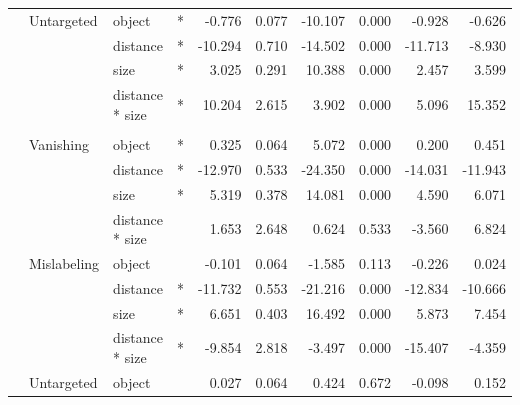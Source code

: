 \documentclass[
]{article}
\begin{document}
\begin{longtable}[t]{llllrrrrrr}
\cmidrule{2-10}\nopagebreak
\hspace{1em} & Untargeted & object & * & -0.776 & 0.077 & -10.107 & 0.000 & -0.928 & -0.626\\
\cmidrule{3-10}\nopagebreak
\hspace{1em} &  & distance & * & -10.294 & 0.710 & -14.502 & 0.000 & -11.713 & -8.930\\
\cmidrule{3-10}\nopagebreak
\hspace{1em} &  & size & * & 3.025 & 0.291 & 10.388 & 0.000 & 2.457 & 3.599\\
\cmidrule{3-10}\nopagebreak
\hspace{1em} &  & distance * size & * & 10.204 & 2.615 & 3.902 & 0.000 & 5.096 & 15.352\\
\cmidrule{1-10}\pagebreak[0]
\addlinespace[0.3em]
\multicolumn{10}{l}{\textbf{SSD}}\\
\hspace{1em} & Vanishing & object & * & 0.325 & 0.064 & 5.072 & 0.000 & 0.200 & 0.451\\
\cmidrule{3-10}\nopagebreak
\hspace{1em} &  & distance & * & -12.970 & 0.533 & -24.350 & 0.000 & -14.031 & -11.943\\
\cmidrule{3-10}\nopagebreak
\hspace{1em} &  & size & * & 5.319 & 0.378 & 14.081 & 0.000 & 4.590 & 6.071\\
\cmidrule{3-10}\nopagebreak
\hspace{1em} &  & distance * size &  & 1.653 & 2.648 & 0.624 & 0.533 & -3.560 & 6.824\\
\cmidrule{2-10}\nopagebreak
\hspace{1em} & Mislabeling & object &  & -0.101 & 0.064 & -1.585 & 0.113 & -0.226 & 0.024\\
\cmidrule{3-10}\nopagebreak
\hspace{1em} &  & distance & * & -11.732 & 0.553 & -21.216 & 0.000 & -12.834 & -10.666\\
\cmidrule{3-10}\nopagebreak
\hspace{1em} &  & size & * & 6.651 & 0.403 & 16.492 & 0.000 & 5.873 & 7.454\\
\cmidrule{3-10}\nopagebreak
\hspace{1em} &  & distance * size & * & -9.854 & 2.818 & -3.497 & 0.000 & -15.407 & -4.359\\
\cmidrule{2-10}\nopagebreak
\hspace{1em} & Untargeted & object &  & 0.027 & 0.064 & 0.424 & 0.672 & -0.098 & 0.152\\

\end{longtable}
\end{document}

